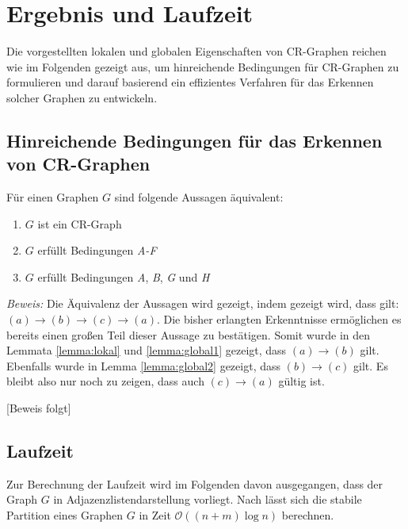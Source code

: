 \section{Ergebnis und Laufzeit}
\label{sec/ergebnis}


Die vorgestellten lokalen und globalen Eigenschaften von CR-Graphen reichen wie im Folgenden gezeigt aus, um hinreichende Bedingungen für CR-Graphen zu formulieren und darauf basierend ein effizientes Verfahren für das Erkennen solcher Graphen zu entwickeln.

\subsection{Hinreichende Bedingungen für das Erkennen von CR-Graphen}
\begin{Theorem}
	Für einen Graphen $G$ sind folgende Aussagen äquivalent:
	
	\begin{enumerate}[label=(\alph*)]
		\item $G$ ist ein CR-Graph
		\item $G$ erfüllt Bedingungen \emph{A-F}
		\item $G$ erfüllt Bedingungen \emph{A}, \emph{B}, \emph{G} und \emph{H}
	\end{enumerate}
\end{Theorem}

\emph{Beweis:} Die Äquivalenz der Aussagen wird gezeigt, indem gezeigt wird, dass gilt: $(a)\rightarrow (b)\rightarrow (c)\rightarrow (a)$.
Die bisher erlangten Erkenntnisse ermöglichen es bereits einen großen Teil dieser Aussage zu bestätigen. Somit wurde in den Lemmata \ref{lemma:lokal} und \ref{lemma:global1} gezeigt, dass $(a)\rightarrow (b)$ gilt. Ebenfalls wurde in Lemma \ref{lemma:global2} gezeigt, dass $(b)\rightarrow (c)$ gilt. Es bleibt also nur noch zu zeigen, dass auch $(c)\rightarrow (a)$ gültig ist.

[Beweis folgt]

\subsection{Laufzeit}
Zur Berechnung der Laufzeit wird im Folgenden davon ausgegangen, dass der Graph $G$ in Adjazenzlistendarstellung vorliegt.
Nach \cite{CARDON198285} lässt sich die stabile Partition eines Graphen $G$ in Zeit $\mathcal{O}((n+m)\log n)$ berechnen.

